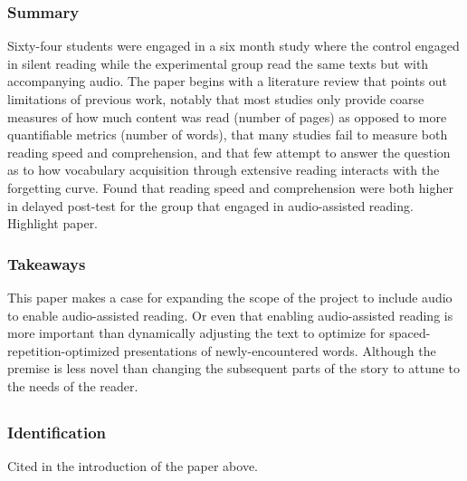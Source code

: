 \documentclass[
	letterpaper, %
]{jdf}
\begin{document}
\subsubsection{Summary}
Sixty-four students were engaged in a six month study where the control engaged in silent reading while the experimental group read the same texts but with accompanying audio. The paper begins with a literature review that points out limitations of previous work, notably that most studies only provide coarse measures of how much content was read (number of pages) as opposed to more quantifiable metrics (number of words), that many studies fail to measure both reading speed and comprehension, and that few attempt to answer the question as to how vocabulary acquisition through extensive reading interacts with the forgetting curve. Found that reading speed and comprehension were both higher in delayed post-test for the group that engaged in audio-assisted reading. Highlight paper.

\subsubsection{Takeaways}
This paper makes a case for expanding the scope of the project to include audio to enable audio-assisted reading. Or even that enabling audio-assisted reading is more important than dynamically adjusting the text to optimize for spaced-repetition-optimized presentations of newly-encountered words. Although the premise is less novel than changing the subsequent parts of the story to attune to the needs of the reader.

\subsection{}
\subsubsection{Identification}
Cited in the introduction of the paper above.
\end{document}
